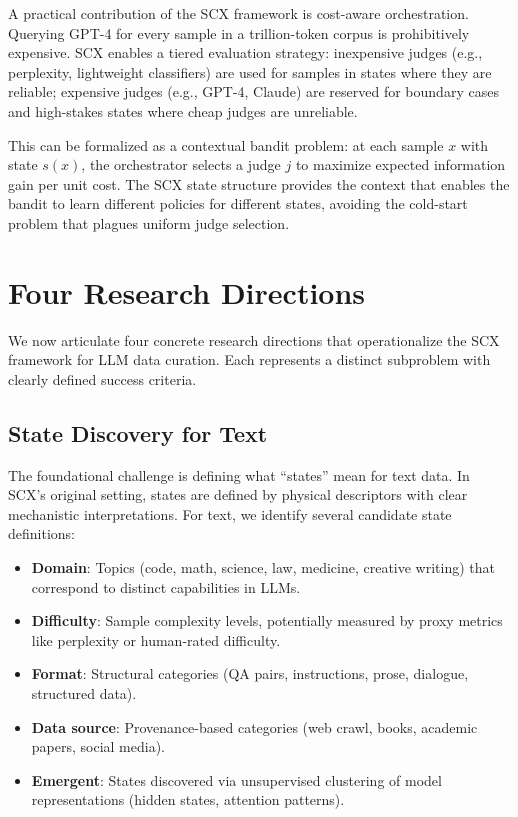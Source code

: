 \documentclass[11pt,twocolumn]{article}
\begin{document}
A practical contribution of the SCX framework is cost-aware orchestration. Querying GPT-4 for every sample in a trillion-token corpus is prohibitively expensive. SCX enables a tiered evaluation strategy: inexpensive judges (e.g., perplexity, lightweight classifiers) are used for samples in states where they are reliable; expensive judges (e.g., GPT-4, Claude) are reserved for boundary cases and high-stakes states where cheap judges are unreliable.

This can be formalized as a contextual bandit problem: at each sample $x$ with state $s(x)$, the orchestrator selects a judge $j$ to maximize expected information gain per unit cost. The SCX state structure provides the context that enables the bandit to learn different policies for different states, avoiding the cold-start problem that plagues uniform judge selection.

\section{Four Research Directions}

We now articulate four concrete research directions that operationalize the SCX framework for LLM data curation. Each represents a distinct subproblem with clearly defined success criteria.

\subsection{State Discovery for Text}
\label{sec:state_discovery}

The foundational challenge is defining what ``states'' mean for text data. In SCX's original setting, states are defined by physical descriptors with clear mechanistic interpretations. For text, we identify several candidate state definitions:

\begin{itemize}
    \item \textbf{Domain}: Topics (code, math, science, law, medicine, creative writing) that correspond to distinct capabilities in LLMs.
    \item \textbf{Difficulty}: Sample complexity levels, potentially measured by proxy metrics like perplexity or human-rated difficulty.
    \item \textbf{Format}: Structural categories (QA pairs, instructions, prose, dialogue, structured data).
    \item \textbf{Data source}: Provenance-based categories (web crawl, books, academic papers, social media).
    \item \textbf{Emergent}: States discovered via unsupervised clustering of model representations (hidden states, attention patterns).
\end{itemize}
\end{document}
